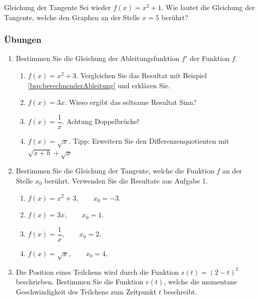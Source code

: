 \begin{example}
    {Gleichung der Tangente}{}
    Sei wieder $f(x)=x^2+1$. Wie lautet die Gleichung der Tangente, welche den Graphen an der Stelle $x=5$ berührt?


\end{example}

\clearpage
\subsubsection{Übungen}
\begin{enumerate}
    \item
          Bestimmen Sie die Gleichung der Ableitungsfunktion \( f' \) der Funktion \( f  \).

          \begin{enumerate}
              \item \( f(x) = x^2 + 3 \). Vergleichen Sie das Resultat mit Beispiel \ref{bsp:berechnenderAbleitung} und erklären Sie.
              \item \( f(x) = 3x \). Wieso ergibt das seltsame Resultat Sinn?
              \item \( f(x)= \dfrac{1}{x} \). Achtung Doppelbrüche!
              \item \( f(x) =\sqrt{x} \). Tipp: Erweitern Sie den Differenzenquotienten mit $\sqrt{x+h} + \sqrt{x}$
          \end{enumerate}
    \item Bestimmen Sie die Gleichung der Tangente, welche die Funktion $f$ an der Stelle $x_0$ berührt. Verwenden Sie die Resultate aus Aufgabe 1.
          \begin{enumerate}
              \item \( f(x) = x^2 + 3, \qquad x_0  = -3 \).
              \item \( f(x) = 3x , \qquad x_0  = 1 \).
              \item \( f(x)= \dfrac{1}{x} , \qquad x_0  = 2 \).
              \item \( f(x) =\sqrt{x}, \qquad x_0  = 4 \).
          \end{enumerate}
    \item Die Position eines Teilchens wird durch die Funktion $s(t) = (2-t)^2$ beschrieben. Bestimmen Sie die Funktion $v(t)$, welche die momentane Geschwindigkeit des Teilchens zum Zeitpunkt $t$ beschreibt.
\end{enumerate}

